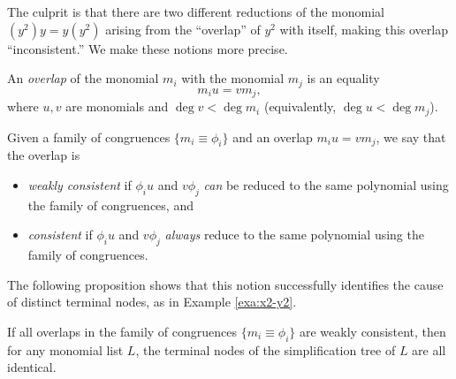 The culprit is that there are two different reductions of the monomial $(y^2) y = y (y^2)$ arising from the ``overlap'' of $y^2$ with itself, making this overlap ``inconsistent.'' We make these notions more precise.
\begin{defn}\label{def:overlap}
	An \emph{overlap} of the monomial $m_i$ with the monomial $m_j$ is an equality
	\[
	m_i u = v m_j,
	\]
	where $u,v$ are monomials and $\deg v < \deg m_i$ (equivalently, $\deg u < \deg m_j$).
\end{defn}
\begin{defn}\label{def:consistent}
	Given a family of congruences $\{m_i \equiv \phi_i\}$ and an overlap $m_i u = v m_j$, we say that the overlap is
	\begin{itemize}
		\item \emph{weakly consistent} if $\phi_i u$ and $v \phi_j$ \emph{can} be reduced to the same polynomial using the family of congruences, and
		\item \emph{consistent} if $\phi_i u$ and $v \phi_j$ \emph{always} reduce to the same polynomial using the family of congruences.
	\end{itemize}
\end{defn}
The following proposition shows that this notion successfully identifies the cause of distinct terminal nodes, as in Example \ref{exa:x2-y2}.
\begin{prop}\label{prop:consistent-tree-terminals}
	If all overlaps in the family of congruences $\{m_i \equiv \phi_i\}$ are weakly consistent, then for any monomial list $L$, the terminal nodes of the simplification tree of $L$ are all identical.
\end{prop}
